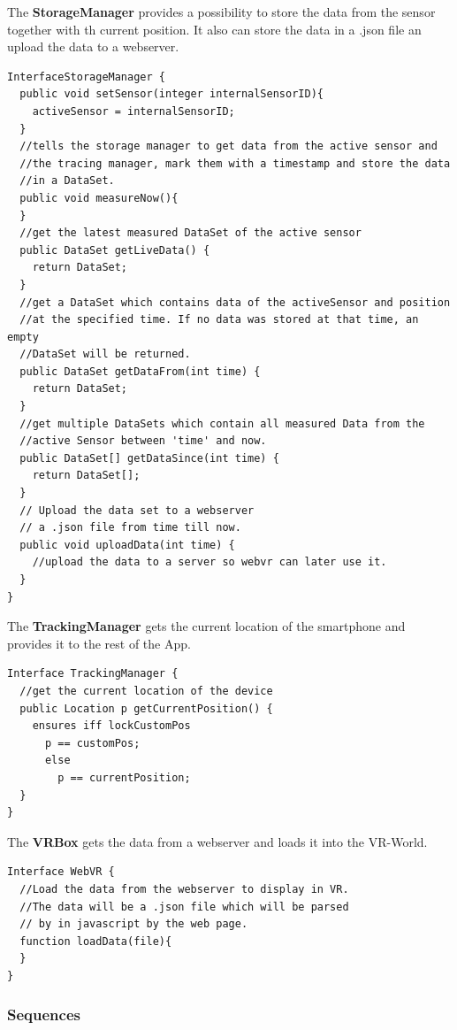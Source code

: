 The \textbf{StorageManager} provides a possibility to store the data from the sensor together with th current position.
It also can store the data in a .json file an upload the data to a webserver.
\\
\begin{lstlisting}
InterfaceStorageManager {
  public void setSensor(integer internalSensorID){
    activeSensor = internalSensorID;
  }
  //tells the storage manager to get data from the active sensor and
  //the tracing manager, mark them with a timestamp and store the data
  //in a DataSet.
  public void measureNow(){
  }
  //get the latest measured DataSet of the active sensor
  public DataSet getLiveData() {
    return DataSet;
  }
  //get a DataSet which contains data of the activeSensor and position
  //at the specified time. If no data was stored at that time, an empty
  //DataSet will be returned.
  public DataSet getDataFrom(int time) {
    return DataSet;
  }
  //get multiple DataSets which contain all measured Data from the
  //active Sensor between 'time' and now.
  public DataSet[] getDataSince(int time) {
    return DataSet[];
  }
  // Upload the data set to a webserver
  // a .json file from time till now.
  public void uploadData(int time) {
    //upload the data to a server so webvr can later use it.
  }
}
\end{lstlisting}
The \textbf{TrackingManager} gets the current location of the smartphone and provides it to the rest of
the App.
\\
\begin{lstlisting}
Interface TrackingManager {
  //get the current location of the device
  public Location p getCurrentPosition() {
    ensures iff lockCustomPos
      p == customPos;
      else
        p == currentPosition;
  }
}
\end{lstlisting}

The \textbf{VRBox} gets the data from a webserver and loads it into the VR-World.
\\
\begin{lstlisting}
Interface WebVR {
  //Load the data from the webserver to display in VR.
  //The data will be a .json file which will be parsed
  // by in javascript by the web page.
  function loadData(file){
  }
}
\end{lstlisting}

\subsubsection{Sequences}

